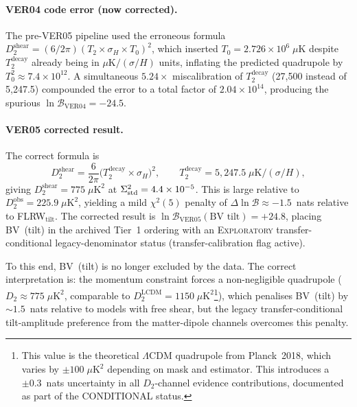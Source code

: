 \paragraph{VER04 code error (now corrected).}
The pre-VER05 pipeline used the erroneous formula
$D_2^{\mathrm{shear}} = (6/2\pi)(T_2 \times \sigma_H \times T_0)^2$,
which inserted $T_0 = 2.726 \times 10^6\;\mu\mathrm{K}$ despite
$T_2^{\mathrm{decay}}$ already being in $\mu\mathrm{K}/(\sigma/H)$
units, inflating the predicted quadrupole by $T_0^2 \approx 7.4 \times
10^{12}$.  A simultaneous $5.24\times$ miscalibration of
$T_2^{\mathrm{decay}}$ (27{,}500 instead of 5{,}247.5) compounded
the error to a total factor of $2.04 \times 10^{14}$, producing the
spurious $\ln\mathcal{B}_{\mathrm{VER04}} = -24.5$.

\paragraph{VER05 corrected result.}
The correct formula is
\begin{equation}
D_2^{\mathrm{shear}}
= \frac{6}{2\pi}\bigl(T_2^{\mathrm{decay}} \times \sigma_H\bigr)^2,
\qquad T_2^{\mathrm{decay}} = 5{,}247.5\;\mu\mathrm{K}/(\sigma/H),
\label{eq:D2-BV-corrected}
\end{equation}
giving $D_2^{\mathrm{shear}} = 775\;\mu\mathrm{K}^2$ at
$\Sigma^2_{\mathrm{std}} = 4.4 \times 10^{-5}$.  This is large relative to
$D_2^{\mathrm{obs}} = 225.9\;\mu\mathrm{K}^2$, yielding a mild
$\chi^2(5)$ penalty of $\Delta\ln\mathcal{B} \approx -1.5$~nats
relative to FLRW$_{\mathrm{tilt}}$.  The corrected result is
$\ln\mathcal{B}_{\mathrm{VER05}}(\text{BV tilt}) = +24.8$,
placing BV~(tilt) in the archived Tier~1 ordering with an
\textsc{Exploratory} transfer-conditional legacy-denominator status
(transfer-calibration flag active).

To this end, BV~(tilt) is no longer excluded by the data.
The correct interpretation is: the momentum constraint forces
a non-negligible quadrupole ($D_2 \approx 775\;\mu\mathrm{K}^2$,
comparable to $D_2^{\mathrm{LCDM}} = 1150\;\mu\mathrm{K}^2$\footnote{%
  This value is the theoretical $\Lambda$CDM quadrupole from Planck~2018, which
  varies by $\pm 100\;\mu\mathrm{K}^2$ depending on mask and estimator.%
  This introduces a $\pm 0.3$~nats uncertainty in all $D_2$-channel
  evidence contributions, documented as part of the CONDITIONAL status.}),
which penalises BV~(tilt) by $\sim 1.5$~nats relative to models
with free shear, but the legacy transfer-conditional
tilt-amplitude preference from the matter-dipole channels
overcomes this penalty.


